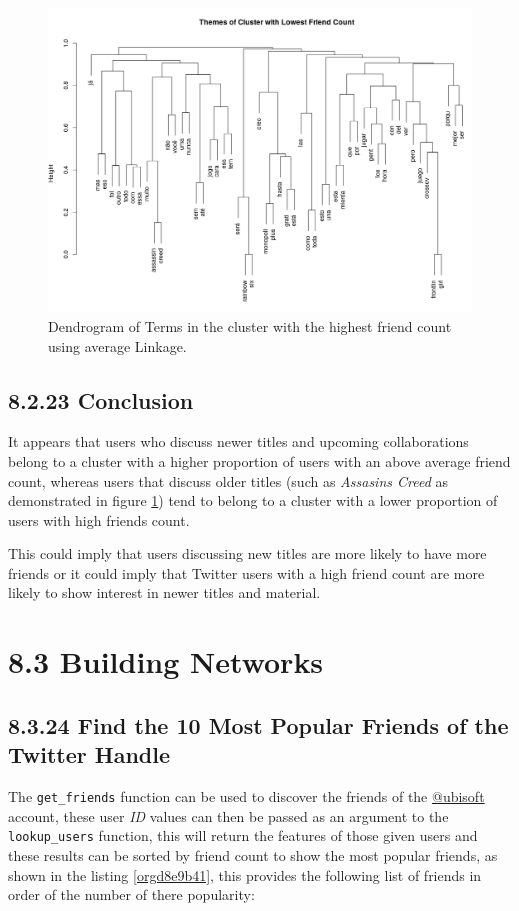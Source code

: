 \documentclass[11pt]{article}
\begin{document}
\begin{figure}[htbp]
\centering
\includegraphics[width=12cm]{./Figures/LowDend.png}
\caption{\label{fig:org98efe73}Dendrogram of Terms in the cluster with the highest friend count using average Linkage.}
\end{figure}

\subsection{8.2.23 Conclusion}
\label{sec:org93b484a}
It appears that users who discuss newer titles and upcoming collaborations belong to a cluster with a higher proportion of users with an above average friend count, whereas users that discuss older titles (such as \emph{Assasins Creed} as demonstrated in figure \ref{fig:org98efe73}) tend to belong to a cluster with a lower proportion of users with high friends count.

This could imply that users discussing new titles are more likely to have more friends or it could imply that Twitter users with a high friend count are more likely to show interest in newer titles and material.
\newpage
\section{8.3 Building Networks}
\label{sec:org7040e0a}
\subsection{8.3.24 Find the 10 Most Popular Friends of the Twitter Handle}
\label{sec:orgeedf6bd}
The \texttt{get\_friends} function can be used to discover the friends of the \href{https://twitter.com/Ubisoft}{@ubisoft}
account, these user \emph{ID} values can then be passed as an argument to the
\texttt{lookup\_users} function, this will return the features of those given users and
these results can be sorted by friend count to show the most popular
friends, as shown in the listing \ref{orgd8e9b41}, this provides the following list of friends in
order of the number of there popularity:
\end{document}

